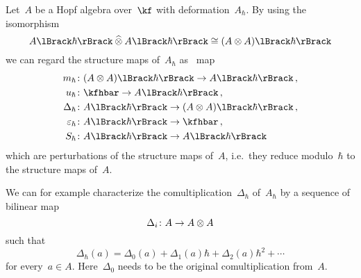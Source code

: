 \documentclass[a4paper, 11pt, oneside]{scrartcl}
\begin{document}
\begin{remark}
  Let~$A$ be a Hopf algebra over~$\kf$ with deformation~$A_{\hbar}$.
  By using the isomorphism
  \[
    \power{A}{\hbar} \ctensor \power{A}{\hbar}
    \cong
    \power{(A \tensor A)}{\hbar}
  \]
  we can regard the structure maps of~$A_{\hbar}$ as~\linear{$\kfhbar$} map
  \begin{equation}
    \label{explicit description of deformed hopf algebra}
    \begin{aligned}
      m_{\hbar} &\colon \power{(A \tensor A)}{\hbar} \to \power{A}{\hbar} \,,
      \\
      u_{\hbar} &\colon \kfhbar \to \power{A}{\hbar} \,,
      \\
      \Delta_{\hbar} &\colon \power{A}{\hbar} \to \power{(A \tensor A)}{\hbar} \,,
      \\
      \varepsilon_{\hbar} &\colon \power{A}{\hbar} \to \kfhbar \,,
      \\
      S_{\hbar} &\colon \power{A}{\hbar} \to \power{A}{\hbar}
    \end{aligned}
  \end{equation}
  which are perturbations of the structure maps of~$A$, i.e.\ they reduce modulo~$\hbar$ to the structure maps of~$A$.

  We can for example characterize the comultiplication~$\Delta_{\hbar}$ of~$A_{\hbar}$ by a sequence of bilinear map
  \[
    \Delta_i \colon A \to A \otimes A
  \]
  such that
  \[
    \Delta_{\hbar}(a)
    =
    \Delta_0(a) + \Delta_1(a) \hbar + \Delta_2(a) \hbar^2 + \dotsb
  \]
  for every~$a \in A$.
  Here~$\Delta_0$ needs to be the original comultiplication from~$A$.
\end{remark}
\end{document}
